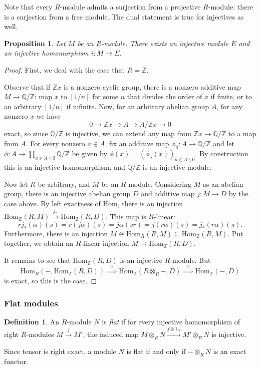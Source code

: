 \documentclass{amsart}[12pt]
\newcommand{\Hom}{\mathrm{Hom}}
\newcommand{\Q}{\mathbb{Q}}
\newcommand{\Z}{\mathbb{Z}}
\newcommand{\DEF}[1]{\emph{#1}\index{#1}}
\numberwithin{equation}{section}
\theoremstyle{plain} %
\newtheorem{prop}[equation]{Proposition}
\theoremstyle{definition}
\newtheorem{defn}[equation]{Definition}
\theoremstyle{remark}
\newcommand{\sssec}[1]{\subsubsection{#1}}
\newcommand{\xra}[1]{\xrightarrow{#1}}
\begin{document}
Note that every $R$-module admits a surjection from a projective $R$-module: there is a surjection from a free module. The dual statement is true for injectives as well.

\begin{prop} Let $M$ be an $R$-module. There exists an injective module $E$ and an injective homomorphism $i:M\to E$.
\end{prop}
\begin{proof}
First, we deal with the case that $R=\Z$.

Observe that if $\Z x$ is a nonzero cyclic group, there is a nonzero additive map $M\to \Q/\Z$: map $x$ to $[1/n]$ for some $n$ that divides the order of $x$ if finite, or to an arbitrary $[1/n]$ if infinite. Now, for an arbitrary abelian group $A$, for any nonzero $x$ we have
\[ 0 \to \Z x \to A \to A/ \Z x \to 0\]
exact, so since $\Q/\Z$ is injective, we can extend any map from $\Z x \to \Q/\Z$ to a map from $A$. For every nonzero $a\in A$, fix an additive map $\phi_a: A \to \Q/\Z$ and let $\phi:A \to \prod_{a\in A\smallsetminus 0} \Q/\Z$ be given by $\phi(x) = (\phi_a(x))_{a\in A\smallsetminus 0}$. By construction this is an injective homomorphism, and $\Q/\Z$ is an injective module.

Now let $R$ be arbitrary, and $M$ be an $R$-module. Considering $M$ as an abelian group, there is an injective abelian group $D$ and additive map $j:M\to D$ by the case above. By left exactness of $\Hom$, there is an injection $\Hom_\Z(R,M) \xra{j_*} \Hom_\Z(R,D)$. This map is $R$-linear: \[ r j_* (\alpha)(s) = r(j \alpha)(s)=j\alpha(sr) = j (r \alpha)(s)= j_*(r \alpha)(s).\]
Furthermore, there is an injection $M \cong \Hom_R(R,M) \subseteq \Hom_\Z(R,M)$. Put together, we obtain an $R$-linear injection $M\to \Hom_\Z(R,D)$. 

It remains to see that $\Hom_\Z(R,D)$ is an injective $R$-module. But \[\Hom_R(- , \Hom_\Z(R,D)) \stackrel{\cong}{\implies} \Hom_\Z(R\otimes_R - , D)  \stackrel{\cong}{\implies} \Hom_\Z ( - ,D)\] is exact, so this is the case.
\end{proof}

\sssec{Flat modules}

\begin{defn} An $R$-module $N$ is \DEF{flat} if for every injective homomorphism of right $R$-modules $M\xra{f} M'$, the induced map $M\otimes_R N \xra{f\otimes 1_N} M' \otimes_R N$ is injective.
\end{defn}

Since tensor is right exact, a module $N$ is flat if and only if $-\otimes_R N$ is an exact functor.
\end{document}
